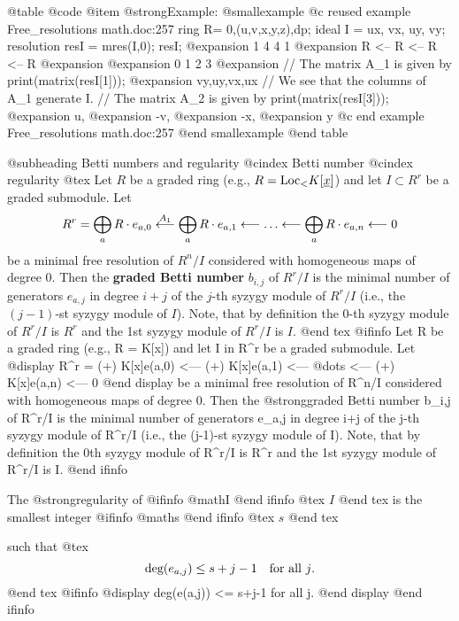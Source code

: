 @table @code
@item @strong{Example:}
@smallexample
@c reused example Free_resolutions math.doc:257 
  ring R= 0,(u,v,x,y,z),dp;
  ideal I = ux, vx, uy, vy;
  resolution resI = mres(I,0); resI;
@expansion{}  1      4      4      1      
@expansion{} R <--  R <--  R <--  R
@expansion{} 
@expansion{} 0      1      2      3      
@expansion{} 
  // The matrix A_1 is given by
  print(matrix(resI[1]));
@expansion{} vy,uy,vx,ux
  // We see that the columns of A_1 generate I.
  // The matrix A_2 is given by
  print(matrix(resI[3]));
@expansion{} u, 
@expansion{} -v,
@expansion{} -x,
@expansion{} y  
@c end example Free_resolutions math.doc:257
@end smallexample
@end table

@subheading Betti numbers and regularity
@cindex Betti number
@cindex regularity
@tex
Let $R$ be a graded ring (e.g., $R = \hbox{Loc}_< K[\underline{x}]$) and
let $I \subset R^r$ be a graded submodule. Let
$$
  R^r = \bigoplus_a R\cdot e_{a,0} \buildrel A_1 \over \longleftarrow
        \bigoplus_a R\cdot e_{a,1} \longleftarrow \ldots \longleftarrow
        \bigoplus_a R\cdot e_{a,n} \longleftarrow 0
$$
be a minimal free resolution of $R^n/I$ considered with homogeneous maps
of degree 0. Then the {\bf graded Betti number} $b_{i,j}$ of $R^r/I$ is
the minimal number of generators $e_{a,j}$ in degree $i+j$ of the $j$-th
syzygy module of $R^r/I$ (i.e., the $(j-1)$-st syzygy module of
$I$). Note, that by definition the $0$-th syzygy module of $R^r/I$ is $R^r$
and the 1st syzygy module of $R^r/I$ is $I$.
@end tex
@ifinfo
Let R be a graded ring (e.g., R = K[x]) and let I in R^r be a graded
submodule. Let
@display
R^r = (+) K[x]e(a,0) <--- (+) K[x]e(a,1)
            <--- @dots{} <--- (+) K[x]e(a,n) <--- 0
@end display
be a minimal free resolution of R^n/I considered with homogeneous maps
of degree 0. Then the @strong{graded Betti number} b_i,j of R^r/I is the
minimal number of generators e_a,j in degree i+j of the j-th syzygy
module of R^r/I (i.e., the (j-1)-st syzygy module of I). Note, that by
definition the 0th syzygy module of R^r/I is R^r and the 1st syzygy module
of R^r/I is I.
@end ifinfo

The @strong{regularity} of 
@ifinfo
@math{I}
@end ifinfo
@tex
$I$
@end tex
 is the smallest integer 
@ifinfo
@math{s}
@end ifinfo
@tex
$s$
@end tex

such that
@tex
$$
    \hbox{deg}(e_{a,j}) \le s+j-1 \quad \hbox{for all $j$.}
$$
@end tex
@ifinfo
@display
deg(e(a,j)) <= s+j-1    for all j.
@end display
@end ifinfo

